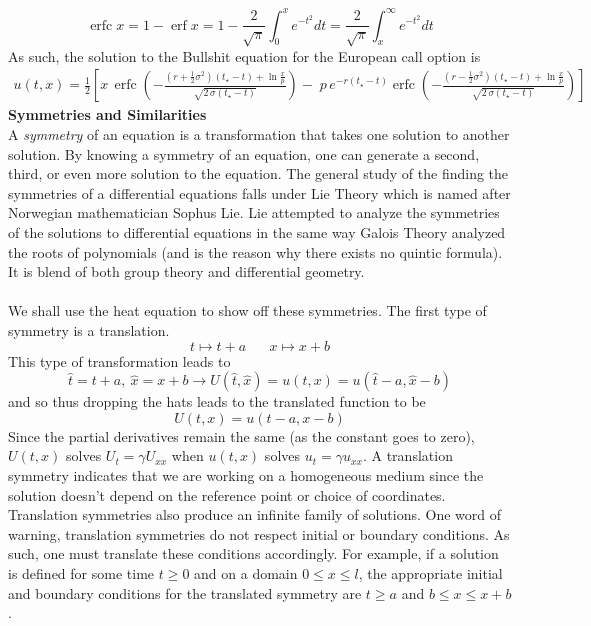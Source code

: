 \documentclass{article}
\numberwithin{equation}{section}
\begin{document}
\begin{equation*}
    \operatorname{erfc} x = 1-\operatorname{erf}x=1-\frac{2}{\sqrt{\pi}}\int^x_0 e^{-t^2}dt = \frac{2}{\sqrt{\pi}} \int^\infty_xe^{-t^2}dt
\end{equation*}
As such, the solution to the Bullshit equation for the European call option is 
\begin{equation*}
\begin{split}
    u(t,x) = \frac{1}{2}\left[ x\,\operatorname{erfc}\left(-\frac{\left(r + \tfrac{1}{2}\sigma^{2}\right)(t_\star - t) + \ln\frac{x}{p}}{\sqrt{2\,\sigma(t_\star - t)}}\right)  
    -\; p\, e^{-r(t_\star-t)}\operatorname{erfc}\left(-\frac{\left(r - \tfrac{1}{2}\sigma^{2}\right)(t_{\star} - t) + \ln\frac{x}{p}}{\sqrt{2\,\sigma(t_{\star} - t)}}\right)\right]
\end{split}
\end{equation*}
\textbf{Symmetries and Similarities} \\
A \textit{symmetry} of an equation is a transformation that takes one solution to another solution. By knowing a symmetry of an equation, one can generate a second, third, or even more solution to the equation. The general study of the finding the symmetries of a differential equations falls under Lie Theory which is named after Norwegian mathematician Sophus Lie. Lie attempted to analyze the symmetries of the solutions to differential equations in the same way Galois Theory analyzed the roots of polynomials (and is the reason why there exists no quintic formula). It is blend of both group theory and differential geometry.\\\\ We shall use the heat equation to show off these symmetries. The first type of symmetry is a translation.
\begin{equation}
    t \mapsto t+a \hspace{20pt} x\mapsto x+b
\end{equation}
This type of transformation leads to 
\begin{equation*}
    \hat{t} =t+a, \ \hat{x}=x+b \rightarrow U(\hat{t},\hat{x}) =u(t,x) =u(\hat{t}-a,\hat{x}-b)
\end{equation*}
and so thus dropping the hats leads to the translated function to be 
\begin{equation}
    U(t,x) = u(t-a,x-b) \label{eq:3.34}
\end{equation}
Since the partial derivatives remain the same (as the constant goes to zero), $U(t,x)$ solves $U_t=\gamma U_{xx}$ when $u(t,x)$ solves $u_t=\gamma u_{xx}$. A translation symmetry indicates that we are working on a homogeneous medium since the solution doesn't depend on the reference point or choice of coordinates. Translation symmetries also produce an infinite family of solutions. One word of warning, translation symmetries do not respect initial or boundary conditions. As such, one must translate these conditions accordingly. For example, if a solution is defined for some time $t\geq 0$ and on a domain $0\leq x\leq l$, the appropriate initial and boundary conditions for the translated symmetry are $t\geq a$ and $b\leq x \leq x+b$. \\\\
\end{document}

